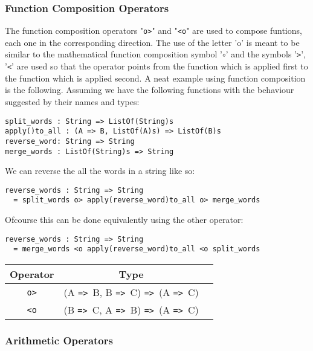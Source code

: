 \documentclass{article}
\def\ra{\texttt{=>}\ }
\begin{document}
\subsubsection{Function Composition Operators}
The function composition operators "\texttt{o>}" and "\texttt{<o}" are used to 
compose funtions, each one in the corresponding direction. The use of the letter 'o'
is meant to be similar to the mathematical function composition symbol '\(\circ\)'
and the symbols '\texttt{>}', '\texttt{<}' are used so that the operator points from
the function which is applied first to the function which is applied second.
A neat example using function composition is the following. Assuming we have the
following functions with the behaviour suggested by their names and types: 
\begin{verbatim}
split_words : String => ListOf(String)s
apply()to_all : (A => B, ListOf(A)s) => ListOf(B)s
reverse_word: String => String
merge_words : ListOf(String)s => String
\end{verbatim}
We can reverse the all the words in a string like so:
\begin{verbatim}
reverse_words : String => String
  = split_words o> apply(reverse_word)to_all o> merge_words
\end{verbatim}
Ofcourse this can be done equivalently using the other operator:
\begin{verbatim}
reverse_words : String => String
  = merge_words <o apply(reverse_word)to_all <o split_words
\end{verbatim}

\begin{center}
\begin{tabular}{ |c|c|c| } 
\hline
Operator & Type \\ 
\hline
\hline
\texttt{o>} & (A \ra B, B \ra C) \ra (A \ra C) \\
\hline
\texttt{<o} & (B \ra C, A \ra B) \ra (A \ra C) \\
\hline
\end{tabular}
\end{center}


\subsubsection{Arithmetic Operators}
\end{document}
